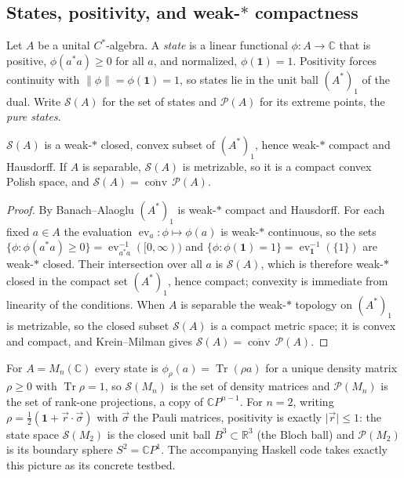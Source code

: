 \documentclass[12pt]{article}
\newcommand{\St}{\mathcal{S}}                   %
\newcommand{\Pu}{\mathcal{P}}                   %
\newcommand{\RR}{\mathbb{R}}
\newcommand{\CC}{\mathbb{C}}
\newcommand{\Mn}{M_{n}(\CC)}
\newcommand{\norm}[1]{\lVert #1 \rVert}
\newcommand{\abs}[1]{\lvert #1 \rvert}
\newcommand{\Tr}{\operatorname{Tr}}
\newcommand{\id}{\mathbf{1}}
\DeclareMathOperator{\ev}{ev}
\theoremstyle{plain}
\begin{document}
\subsection{States, positivity, and weak-\texorpdfstring{$\ast$}{*} compactness}

Let $A$ be a unital $C^{*}$-algebra. A \emph{state} is a linear functional
$\phi:A\to\CC$ that is positive, $\phi(a^{*}a)\ge 0$ for all $a$, and normalized,
$\phi(\id)=1$. Positivity forces continuity with $\norm{\phi}=\phi(\id)=1$, so states
lie in the unit ball $(A^{*})_{1}$ of the dual. Write $\St(A)$ for the set of states
and $\Pu(A)$ for its extreme points, the \emph{pure states}.

\begin{lemma}
\label{lem:alaoglu}
$\St(A)$ is a weak-$\ast$ closed, convex subset of $(A^{*})_{1}$, hence weak-$\ast$
compact and Hausdorff. If $A$ is separable, $\St(A)$ is metrizable, so it is a
compact convex Polish space, and $\St(A)=\overline{\operatorname{conv}}\,\Pu(A)$.
\end{lemma}

\begin{proof}
By Banach--Alaoglu $(A^{*})_{1}$ is weak-$\ast$ compact and Hausdorff. For each fixed
$a\in A$ the evaluation $\ev_{a}:\phi\mapsto\phi(a)$ is weak-$\ast$ continuous, so
the sets $\{\phi:\phi(a^{*}a)\ge 0\}=\ev_{a^{*}a}^{-1}([0,\infty))$ and
$\{\phi:\phi(\id)=1\}=\ev_{\id}^{-1}(\{1\})$ are weak-$\ast$ closed. Their
intersection over all $a$ is $\St(A)$, which is therefore weak-$\ast$ closed in the
compact set $(A^{*})_{1}$, hence compact; convexity is immediate from linearity of
the conditions. When $A$ is separable the weak-$\ast$ topology on $(A^{*})_{1}$ is
metrizable, so the closed subset $\St(A)$ is a compact metric space; it is convex
and compact, and Krein--Milman gives
$\St(A)=\overline{\operatorname{conv}}\,\Pu(A)$.
\end{proof}

\begin{example}
\label{ex:bloch}
For $A=\Mn$ every state is $\phi_{\rho}(a)=\Tr(\rho a)$ for a unique density matrix
$\rho\ge 0$ with $\Tr\rho=1$, so $\St(M_{n})$ is the set of density matrices and
$\Pu(M_{n})$ is the set of rank-one projections, a copy of $\CC P^{n-1}$. For $n=2$,
writing $\rho=\tfrac12(\id+\vec r\cdot\vec\sigma)$ with $\vec\sigma$ the Pauli
matrices, positivity is exactly $\abs{\vec r}\le 1$: the state space $\St(M_{2})$ is
the closed unit ball $B^{3}\subset\RR^{3}$ (the Bloch ball) and $\Pu(M_{2})$ is its
boundary sphere $S^{2}=\CC P^{1}$. The accompanying Haskell code takes exactly this
picture as its concrete testbed.
\end{example}
\end{document}
